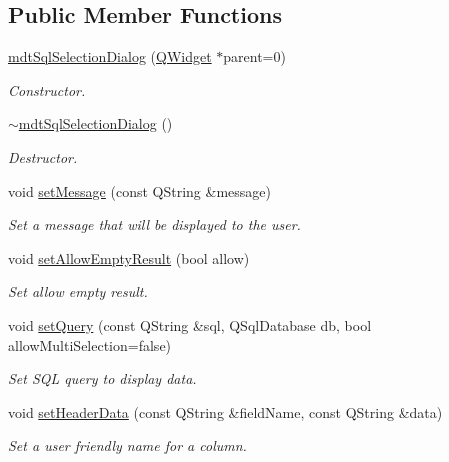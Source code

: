 \subsection*{Public Member Functions}
\begin{DoxyCompactItemize}
\item 
\hyperlink{classmdt_sql_selection_dialog_aaeb4d47e400bff8e58dec9f84f00517c}{mdt\-Sql\-Selection\-Dialog} (\hyperlink{class_q_widget}{Q\-Widget} $\ast$parent=0)
\begin{DoxyCompactList}\small\item\em Constructor. \end{DoxyCompactList}\item 
\hyperlink{classmdt_sql_selection_dialog_a586e3cb812e5e9634f42cb40bfd2d724}{$\sim$mdt\-Sql\-Selection\-Dialog} ()
\begin{DoxyCompactList}\small\item\em Destructor. \end{DoxyCompactList}\item 
void \hyperlink{classmdt_sql_selection_dialog_ab5ea543ebded60b4354c7c0902ca021f}{set\-Message} (const Q\-String \&message)
\begin{DoxyCompactList}\small\item\em Set a message that will be displayed to the user. \end{DoxyCompactList}\item 
void \hyperlink{classmdt_sql_selection_dialog_a5265f64e773a64f34602ddf9b953821b}{set\-Allow\-Empty\-Result} (bool allow)
\begin{DoxyCompactList}\small\item\em Set allow empty result. \end{DoxyCompactList}\item 
void \hyperlink{classmdt_sql_selection_dialog_a7bc61efc9e0e0d141f6109cc86d1634d}{set\-Query} (const Q\-String \&sql, Q\-Sql\-Database db, bool allow\-Multi\-Selection=false)
\begin{DoxyCompactList}\small\item\em Set S\-Q\-L query to display data. \end{DoxyCompactList}\item 
void \hyperlink{classmdt_sql_selection_dialog_afc29f8965c2d6cc103d021ab54298a84}{set\-Header\-Data} (const Q\-String \&field\-Name, const Q\-String \&data)
\begin{DoxyCompactList}\small\item\em Set a user friendly name for a column. \end{DoxyCompactList}\item 

\end{DoxyCompactItemize}
